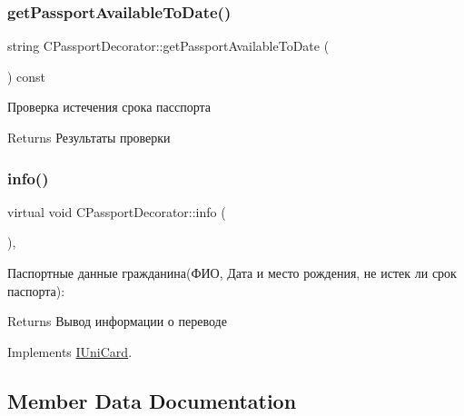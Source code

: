 \subsubsection{\texorpdfstring{get\+Passport\+Available\+To\+Date()}{getPassportAvailableToDate()}}
{\footnotesize\ttfamily string C\+Passport\+Decorator\+::get\+Passport\+Available\+To\+Date (\begin{DoxyParamCaption}{ }\end{DoxyParamCaption}) const\hspace{0.3cm}{\ttfamily [inline]}}



Проверка истечения срока пасспорта 

\begin{DoxyReturn}{Returns}
Результаты проверки 
\end{DoxyReturn}
\mbox{\label{classCPassportDecorator_aec16f6c3f9feaa6da4d8cef5ea27c7b8}} 
\subsubsection{\texorpdfstring{info()}{info()}}
{\footnotesize\ttfamily virtual void C\+Passport\+Decorator\+::info (\begin{DoxyParamCaption}{ }\end{DoxyParamCaption})\hspace{0.3cm}{\ttfamily [inline]}, {\ttfamily [virtual]}}



Паспортные данные гражданина(ФИО, Дата и место рождения, не истек ли срок паспорта)\+: 

\begin{DoxyReturn}{Returns}
Вывод информации о переводе 
\end{DoxyReturn}


Implements \hyperlink{classIUniCard}{I\+Uni\+Card}.



\subsection{Member Data Documentation}
\mbox{\label{classCPassportDecorator_a2497ce4827a91e25a28756a56a8ba245}} 

